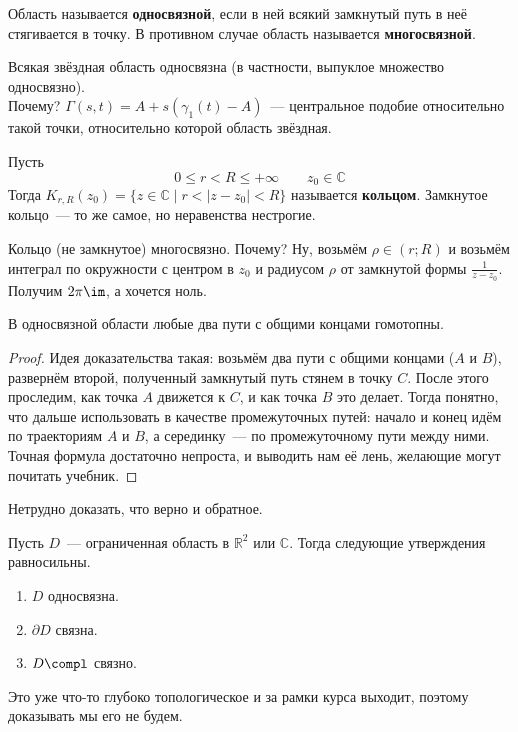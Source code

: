 \documentclass{article}
\begin{document}
    \begin{definition}
        Область называется \textbf{односвязной}, если в ней всякий замкнутый путь в неё стягивается в точку. В противном случае область называется \textbf{многосвязной}.
    \end{definition}
    \begin{example}
        Всякая звёздная область односвязна (в частности, выпуклое множество односвязно).\\
        Почему? $\Gamma(s,t)=A+s(\gamma_1(t)-A)$~--- центральное подобие относительно такой точки, относительно которой область звёздная.
    \end{example}
    \begin{definition}
        Пусть
        $$
        0\leqslant r<R\leqslant+\infty\qquad z_0\in\mathbb C
        $$
        Тогда $K_{r,R}(z_0)=\{z\in\mathbb C\mid r<|z-z_0|<R\}$ называется \textbf{кольцом}. Замкнутое кольцо~--- то же самое, но неравенства нестрогие.
    \end{definition}
    \begin{example}
        Кольцо (не замкнутое) многосвязно. Почему? Ну, возьмём $\rho\in(r;R)$ и возьмём интеграл по окружности с центром в $z_0$ и радиусом $\rho$ от замкнутой формы $\frac1{z-z_0}$. Получим $2\pi\im$, а хочется ноль.
    \end{example}
    \begin{claim}
        В односвязной области любые два пути с общими концами гомотопны.
    \end{claim}
    \begin{proof}
        Идея доказательства такая: возьмём два пути с общими концами ($A$ и $B$), развернём второй, полученный замкнутый путь стянем в точку $C$. После этого проследим, как точка $A$ движется к $C$, и как точка $B$ это делает. Тогда понятно, что дальше использовать в качестве промежуточных путей: начало и конец идём по траекториям $A$ и $B$, а серединку~--- по промежуточному пути между ними.\\
        Точная формула достаточно непроста, и выводить нам её лень, желающие могут почитать учебник.
    \end{proof}
    \begin{claim}
        Нетрудно доказать, что верно и обратное.
    \end{claim}
    \begin{claim}
        Пусть $D$~--- ограниченная область в $\mathbb R^2$ или $\mathbb C$. Тогда следующие утверждения равносильны.
        \begin{enumerate}
            \item $D$ односвязна.
            \item $\partial D$ связна.
            \item $D\compl$ связно.
        \end{enumerate}
        Это уже что-то глубоко топологическое и за рамки курса выходит, поэтому доказывать мы его не будем.
    \end{claim}
\end{document}
